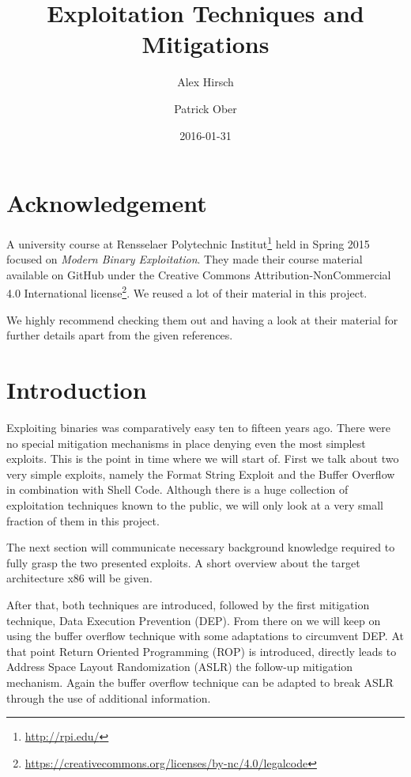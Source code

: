 \documentclass[article]{uibk}
\title{Exploitation Techniques and Mitigations}
\author{Alex Hirsch \and Patrick Ober}
\date{2016-01-31}
\begin{document}
%
%
%

\section*{Acknowledgement}

A university course at Rensselaer Polytechnic
Institut\footnote{\url{http://rpi.edu/}} held in Spring 2015 focused on
\textit{Modern Binary Exploitation}. They made their course material available
on GitHub \cite{RPISEC} under the Creative Commons Attribution-NonCommercial
4.0 International
license\footnote{\url{https://creativecommons.org/licenses/by-nc/4.0/legalcode}}.
We reused a lot of their material in this project.

We highly recommend checking them out and having a look at their material for
further details apart from the given references.

\section{Introduction}

Exploiting binaries was comparatively easy ten to fifteen years ago. There were
no special mitigation mechanisms in place denying even the most simplest
exploits. This is the point in time where we will start of. First we talk about
two very simple exploits, namely the Format String Exploit and the Buffer
Overflow in combination with Shell Code. Although there is a huge collection of
exploitation techniques known to the public, we will only look at a very small
fraction of them in this project.

The next section will communicate necessary background knowledge required to
fully grasp the two presented exploits. A short overview about the target
architecture x86 will be given.

After that, both techniques are introduced, followed by the first mitigation
technique, Data Execution Prevention (DEP). From there on we will keep on using
the buffer overflow technique with some adaptations to circumvent DEP. At that
point Return Oriented Programming (ROP) is introduced, directly leads to
Address Space Layout Randomization (ASLR) the follow-up mitigation mechanism.
Again the buffer overflow technique can be adapted to break ASLR through the
use of additional information.
\end{document}
